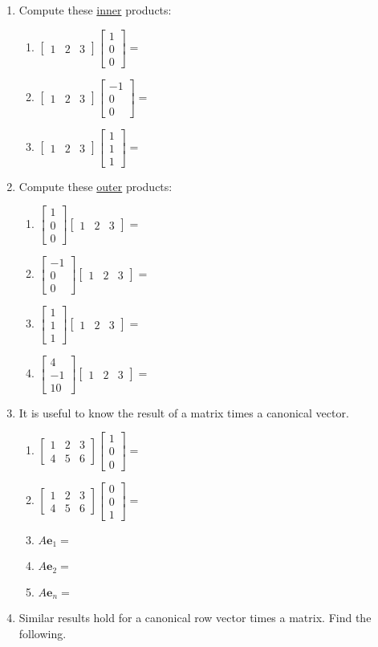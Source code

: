 \documentclass{article}
\renewcommand{\vec}[1]{\mathbf{#1}}
\newcommand{\mx}[1]{\begin{bmatrix} #1 \end{bmatrix}}
\begin{document}
\begin{enumerate}
\item Compute these \underline{inner} products:
  \begin{enumerate}
    \item $\mx{1 & 2 & 3} \mx{1 \\ 0 \\ 0} = $
    \item $\mx{1 & 2 & 3} \mx{-1 \\ 0 \\ 0} = $
    \item $\mx{1 & 2 & 3} \mx{1 \\ 1 \\ 1} = $
  \end{enumerate}
\item Compute these \underline{outer} products:
  \begin{enumerate}
    \item $\mx{1 \\ 0 \\ 0} \mx{1 & 2 & 3}  = $
    \item $\mx{-1 \\ 0 \\ 0} \mx{1 & 2 & 3}  = $
    \item $\mx{1 \\ 1 \\ 1} \mx{1 & 2 & 3}  = $
    \item $\mx{4 \\ -1 \\ 10} \mx{1 & 2 & 3}  = $
  \end{enumerate}
\item It is useful to know the result of a matrix times a canonical vector.
\begin{enumerate}
\item $\mx{ 1 & 2 & 3\\ 4& 5 & 6} \mx{1 \\ 0 \\ 0} = $
\item $\mx{ 1 & 2 & 3\\ 4& 5 & 6} \mx{0 \\ 0 \\ 1} = $
\end{enumerate}
\begin{enumerate}
  \setcounter{enumii}{2}
  \item $ A \vec{e}_1 =$
  \item $ A \vec{e}_2 =$
  \item $ A \vec{e}_n =$
\end{enumerate}
\item Similar results hold for a canonical row vector times a matrix. Find the following.

\end{enumerate}
\end{document}
